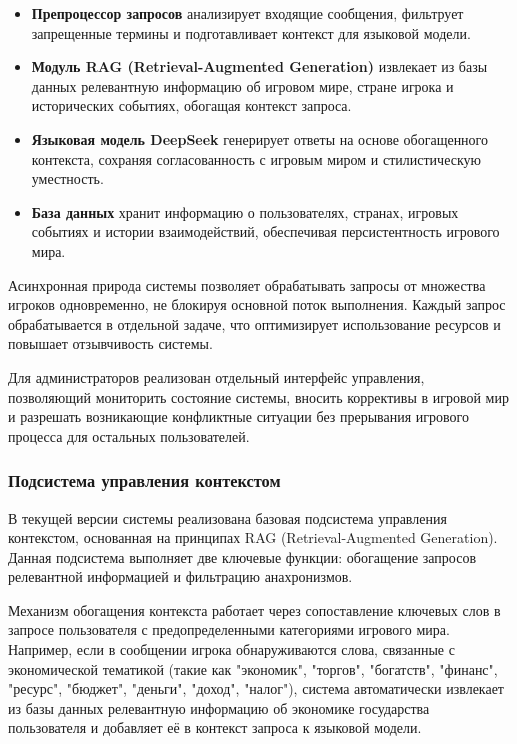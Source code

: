 \begin{itemize}
\item \textbf{Препроцессор запросов} анализирует входящие сообщения, фильтрует запрещенные термины и подготавливает контекст для языковой модели.

\item \textbf{Модуль RAG (Retrieval-Augmented Generation)} извлекает из базы данных релевантную информацию об игровом мире, стране игрока и исторических событиях, обогащая контекст запроса.

\item \textbf{Языковая модель DeepSeek} генерирует ответы на основе обогащенного контекста, сохраняя согласованность с игровым миром и стилистическую уместность.

\item \textbf{База данных} хранит информацию о пользователях, странах, игровых событиях и истории взаимодействий, обеспечивая персистентность игрового мира.
\end{itemize}

Асинхронная природа системы позволяет обрабатывать запросы от множества игроков одновременно, не блокируя основной поток выполнения. Каждый запрос обрабатывается в отдельной задаче, что оптимизирует использование ресурсов и повышает отзывчивость системы.

Для администраторов реализован отдельный интерфейс управления, позволяющий мониторить состояние системы, вносить коррективы в игровой мир и разрешать возникающие конфликтные ситуации без прерывания игрового процесса для остальных пользователей.

\subsubsection{Подсистема управления контекстом}

В текущей версии системы реализована базовая подсистема управления контекстом, основанная на принципах RAG (Retrieval-Augmented Generation). Данная подсистема выполняет две ключевые функции: обогащение запросов релевантной информацией и фильтрацию анахронизмов.

Механизм обогащения контекста работает через сопоставление ключевых слов в запросе пользователя с предопределенными категориями игрового мира. Например, если в сообщении игрока обнаруживаются слова, связанные с экономической тематикой (такие как "экономик", "торгов", "богатств", "финанс", "ресурс", "бюджет", "деньги", "доход", "налог"), система автоматически извлекает из базы данных релевантную информацию об экономике государства пользователя и добавляет её в контекст запроса к языковой модели.

